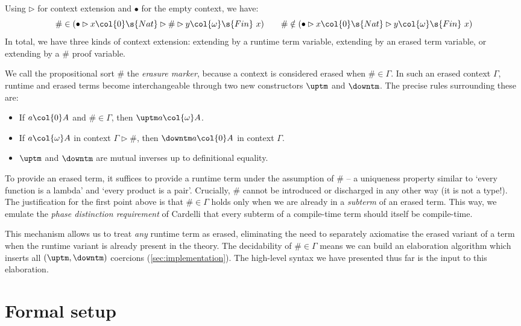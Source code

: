 \documentclass[a4paper,UKenglish,cleveref,autoref,thm-restate]{lipics-v2021}
\begin{document}
\begin{example}
Using $\rhd$ for context extension and $\bullet$
for the empty context, we have:
$$
\# \in (\bullet \rhd x \col{0} \s{Nat} \rhd \# \rhd y \col{\omega} \s{Fin}\ x) \qquad
\# \notin (\bullet \rhd x \col{0} \s{Nat} \rhd y \col{\omega} \s{Fin}\ x) 
$$
In total, we have three kinds of context extension:
extending by a runtime term variable, extending by an erased term variable, or extending
by a $\#$ proof variable.
\end{example}

We call the propositional sort $\#$ the \emph{erasure marker}, because a context
is considered erased when $\# \in \Gamma$. In such an erased context $\Gamma$,
runtime and erased terms become interchangeable through two new constructors
$\uptm$ and $\downtm$. The precise rules surrounding these are:
\begin{itemize}
    \item \label{item:marker-1} If $a \col{0} A$ and $\# \in \Gamma$,
      then ${\uptm a} \col{\omega} A$.
    \item \label{item:marker-2} If $a \col{\omega} A$ in context $\Gamma \rhd \#$, then ${\downtm a}
      \col{0} A$ in context $\Gamma$.
    \item \label{item:marker-3} $\uptm$ and $\downtm$ are mutual inverses up to definitional equality.
\end{itemize}
To provide an erased term, it suffices to provide a runtime term under the
assumption of $\#$ -- a uniqueness property similar to `every function is a
lambda' and `every product is a pair'. Crucially, $\#$ cannot be introduced or
discharged in any other way (it is not a type!). The justification for the first point above is that
$\# \in \Gamma$ holds only when we are already in a \emph{subterm} of an erased
term. This way, we emulate the \emph{phase distinction requirement} of Cardelli
that every subterm of a compile-time term should itself be compile-time.

This mechanism allows us to treat \emph{any} runtime term as erased, eliminating
the need to separately axiomatise the erased variant of a term when the runtime
variant is already present in the theory. The decidability of $\# \in \Gamma$
means we can build an elaboration algorithm which inserts all $(\uptm,\downtm)$
coercions (\cref{sec:implementation}). The high-level syntax we have presented
thus far is the input to this elaboration.

\section{Formal setup} \label{sec:formal}
\end{document}
